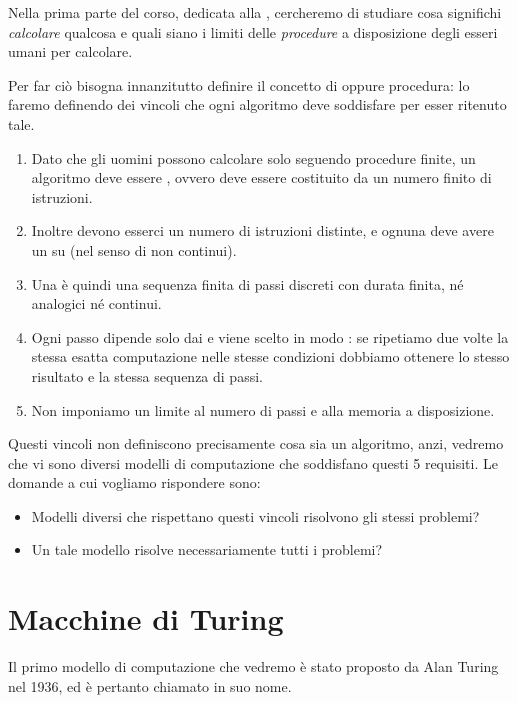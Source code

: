 Nella prima parte del corso, dedicata alla , cercheremo di studiare cosa significhi \emph{calcolare} qualcosa e quali siano i limiti delle \emph{procedure} a disposizione degli esseri umani per calcolare.

Per far ciò bisogna innanzitutto definire il concetto di  oppure procedura: lo faremo definendo dei vincoli che ogni algoritmo deve soddisfare per esser ritenuto tale.

\begin{enumerate}
    \item Dato che gli uomini possono calcolare solo seguendo procedure finite, un algoritmo deve essere , ovvero deve essere costituito da un numero finito di istruzioni.
    \item Inoltre devono esserci un numero  di istruzioni distinte, e ognuna deve avere un  su  (nel senso di non continui).
    \item Una  è quindi una sequenza finita di passi discreti con durata finita, né analogici né continui.
    \item Ogni passo dipende solo dai  e viene scelto in modo : se ripetiamo due volte la stessa esatta computazione nelle stesse condizioni dobbiamo ottenere lo stesso risultato e la stessa sequenza di passi.
    \item Non imponiamo un limite al numero di passi e alla memoria a disposizione.
\end{enumerate}

Questi vincoli non definiscono precisamente cosa sia un algoritmo, anzi, vedremo che vi sono diversi modelli di computazione che soddisfano questi 5 requisiti. Le domande a cui vogliamo rispondere sono: \begin{itemize}
    \item Modelli diversi che rispettano questi vincoli risolvono gli stessi problemi?
    \item Un tale modello risolve necessariamente tutti i problemi?
\end{itemize}

\section{Macchine di Turing}

Il primo modello di computazione che vedremo è stato proposto da Alan Turing nel 1936, ed è pertanto chiamato in suo nome.

